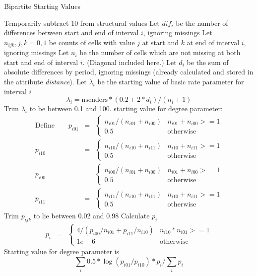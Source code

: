 \documentclass[12pt,a4paper]{article}
\makeatletter
\renewcommand{\=}{\,=\,}
\newcommand{\+}{\,+\,}
\newcommand{\nnm}[1]{\textsf{\textit{#1}}}
\renewcommand{\subsection}{\@startsection{subsection}{2}
                {0pt}{0.7\baselineskip}{0.3\baselineskip}
                {\sffamily} }
\makeatother
\begin{document}
\subsection{Bipartite Starting Values}
\label{sec:bipartitestart}
\begin{algorithmic}
\STATE Temporarily subtract 10 from structural values
\STATE Let $dif_i$ be the number of differences between start and end of
interval $i$, ignoring missings
\STATE Let $n_{ijk}, j, k = 0,1$ be counts of cells with value $j$ at start
and $k$ at end of interval $i$, ignoring missings
\STATE Let $n_i$ be the number of cells which are not missing at both start
and end of interval $i$. (Diagonal included here.)
\STATE Let $d_i$ be the sum of absolute differences by period, ignoring missings
(already calculated and stored in the attribute \nnm{distance}).
\STATE Let $\lambda_i$ be the starting value of basic rate parameter for
interval $i$
\STATE
$$\lambda_i = \mathrm{nsenders} * (0.2 + 2 * d_i)/(n_i + 1)$$
\STATE Trim $\lambda_i$ to be between 0.1 and 100.
\STATE starting value for degree parameter:
\begin{align*}
\mathrm{Define } \qquad  p_{i01} &=& \begin{cases}
n_{i01}/ (n_{i01} + n_{i00}) &n_{i01} + n_{i00} >= 1  \\
0.5& \mathrm{otherwise}
\end{cases}\\
p_{i10} &=& \begin{cases}
n_{i10}/ (n_{i10} + n_{i11}) &n_{i10} + n_{i11} >= 1  \\
0.5& \mathrm{otherwise}
\end{cases}\\
  p_{i00} &=& \begin{cases}
n_{i00}/ (n_{i01} + n_{i00}) &n_{i01} + n_{i00} >= 1  \\
0.5& \mathrm{otherwise}
\end{cases}\\
p_{i11} &=& \begin{cases}
n_{i11}/ (n_{i10} + n_{i11}) &n_{i10} + n_{i11} >= 1  \\
0.5& \mathrm{otherwise}
\end{cases}
\end{align*}
\STATE Trim $p_{ijk}$ to lie between 0.02 and 0.98
\STATE Calculate $p_i$
\begin{align*}
p_i &=& \begin{cases}
4 / (p_{i00} / n_{i01} + p_{i11} / n_{i10})& n_{i10} * n_{i01} >= 1  \\
1e-6& \mathrm{otherwise}
\end{cases}
\end{align*}
\STATE Starting value for degree parameter is\\
$$ \sum_i 0.5 * \log(p_{i01} / p_{i10}) * p_i / \sum_i p_i $$
\end{algorithmic}
\end{document}
